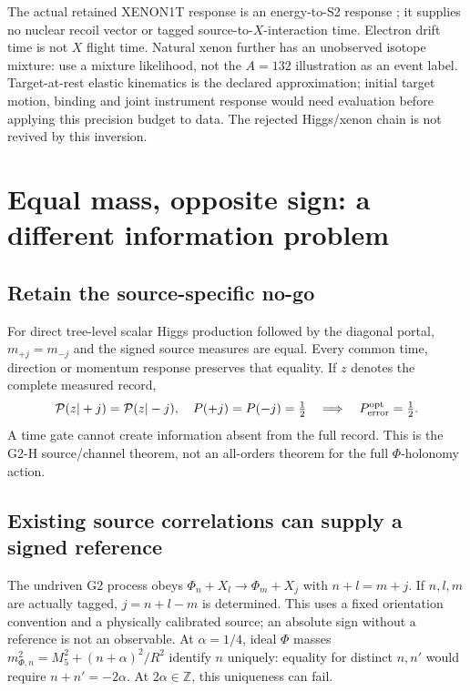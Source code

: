 \documentclass[11pt,a4paper]{article}
\begin{document}
The actual retained XENON1T response is an energy-to-S2 response
\cite{xenon}; it supplies no nuclear recoil vector or tagged
source-to-$X$-interaction time. Electron drift time is not $X$ flight
time. Natural xenon further has an unobserved isotope mixture: use a
mixture likelihood, not the $A=132$ illustration as an event label.
Target-at-rest elastic kinematics is the declared approximation;
initial target motion, binding and joint instrument response would
need evaluation before applying this precision budget to data.
The rejected Higgs/xenon chain is not revived by this inversion.

\newpage
\section{Equal mass, opposite sign: a different information problem}
\subsection*{Retain the source-specific no-go}
For direct tree-level scalar Higgs production followed by the diagonal
portal, $m_{+j}=m_{-j}$ and the signed source measures are equal.
Every common time, direction or momentum response preserves that
equality. If $z$ denotes the complete measured record,
\begin{equation}
 {\cal P}(z|+j)={\cal P}(z|-j),\quad
 P(+j)=P(-j)=\tfrac12
 \quad\Longrightarrow\quad P_{\rm error}^{\rm opt}=\tfrac12 .
\end{equation}
A time gate cannot create information absent from the full record.
This is the G2-H source/channel theorem, not an all-orders theorem
for the full $\Phi$-holonomy action.

\subsection*{Existing source correlations can supply a signed reference}
The undriven G2 process obeys
$\Phi_n+X_l\longrightarrow\Phi_m+X_j$ with $n+l=m+j$.
If $n,l,m$ are actually tagged, $j=n+l-m$ is determined.
This uses a fixed orientation convention and a physically calibrated
source; an absolute sign without a reference is not an observable.
At $\alpha=1/4$, ideal $\Phi$ masses
$m_{\Phi,n}^2=M_5^2+(n+\alpha)^2/R^2$ identify $n$ uniquely:
equality for distinct $n,n'$ would require $n+n'=-2\alpha$.
At $2\alpha\in\mathbb Z$, this uniqueness can fail.
\end{document}
